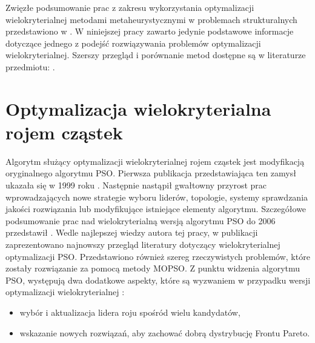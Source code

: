 Zwięzłe podsumowanie prac z zakresu wykorzystania optymalizacji wielokryterialnej metodami metaheurystycznymi w problemach strukturalnych przedstawiono w \parencite{Zavala2014}. W niniejszej pracy zawarto jedynie podstawowe informacje dotyczące jednego z podejść rozwiązywania problemów optymalizacji wielokryterialnej. Szerszy przegląd i porównanie metod dostępne są w literaturze przedmiotu: \parencite{Miettinen1999,Zitzler2000,Elbeltagi2005,Abido2006,Coello2007,Lalwani2013,Zaman2019}. 

\section{Optymalizacja wielokryterialna rojem cząstek}
Algorytm służący optymalizacji wielokryterialnej rojem cząstek  jest modyfikacją oryginalnego algorytmu PSO. Pierwsza publikacja przedstawiająca ten zamysł ukazała się w 1999 roku \parencite{Moore1999}. Następnie nastąpił gwałtowny przyrost prac wprowadzających nowe strategie wyboru liderów, topologie, systemy sprawdzania jakości rozwiązania lub modyfikujące istniejące elementy algorytmu. Szczegółowe podsumowanie prac nad wielokryterialną wersją algorytmu PSO do 2006 przedstawił \parencite{CoelloCoello2006}. Wedle najlepszej wiedzy autora tej pracy, w publikacji \cite{Lalwani2013} zaprezentowano najnowszy przegląd literatury dotyczący wielokryterialnej optymalizacji PSO. Przedstawiono również szereg rzeczywistych problemów, które zostały rozwiązanie za pomocą metody MOPSO.
Z punktu widzenia algorytmu PSO, występują dwa dodatkowe aspekty, które są wyzwaniem w przypadku wersji optymalizacji wielokryterialnej \parencite{Pulido2005OnTU}:
\begin{itemize}
	\item wybór i aktualizacja lidera roju spośród wielu kandydatów,
	\item wskazanie nowych rozwiązań, aby zachować dobrą dystrybucję Frontu Pareto.
\end{itemize}
